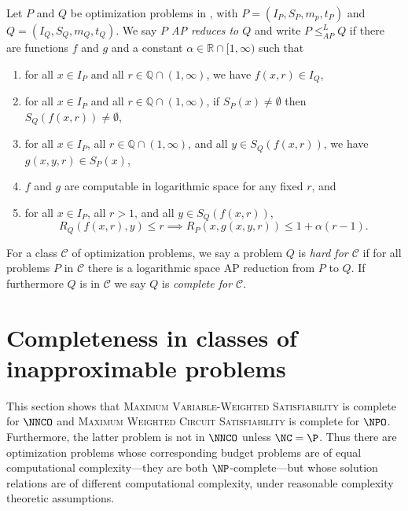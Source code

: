 \begin{definition}{{\cite[Definition~8.3]{acgkmp99}}}
  Let $P$ and $Q$ be optimization problems in \NNCO, with $P = (I_P, S_P, m_p, t_P)$ and $Q = (I_Q, S_Q, m_Q, t_Q)$.
  We say \emph{$P$ AP reduces to $Q$} and write $P \leq_{AP}^{L} Q$ if there are functions $f$ and $g$ and a constant $\alpha \in \mathbb{R} \cap [1, \infty)$ such that
  \begin{enumerate}
  \item for all $x \in I_P$ and all $r \in \mathbb{Q} \cap (1, \infty)$, we have $f(x, r) \in I_Q$,
  \item for all $x \in I_P$ and all $r \in \mathbb{Q} \cap (1, \infty)$, if $S_P(x) \neq \emptyset$ then $S_Q(f(x, r)) \neq \emptyset$,
  \item for all $x \in I_P$, all $r \in \mathbb{Q} \cap (1, \infty)$, and all $y \in S_Q(f(x, r))$, we have $g(x, y, r) \in S_P(x)$,
  \item $f$ and $g$ are computable in logarithmic space for any fixed $r$, and
  \item for all $x \in I_P$, all $r > 1$, and all $y\in S_Q(f(x, r))$,
    \begin{equation*}
      R_Q(f(x, r), y) \leq r \implies R_P(x, g(x, y, r)) \leq 1 + \alpha(r - 1).
    \end{equation*}
  \end{enumerate}
\end{definition}


For a class $\mathcal{C}$ of optimization problems, we say a problem $Q$ is \emph{hard for $\mathcal{C}$} if for all problems $P$ in $\mathcal{C}$ there is a logarithmic space AP reduction from $P$ to $Q$.
If furthermore $Q$ is in $\mathcal{C}$ we say $Q$ is \emph{complete for $\mathcal{C}$}.

\section{Completeness in classes of inapproximable problems}
\label{sec:nncocomplete}

This section shows that \textsc{Maximum Variable-Weighted Satisfiability} is complete for $\NNCO$ and \textsc{Maximum Weighted Circuit Satisfiability} is complete for $\NPO$.
Furthermore, the latter problem is not in $\NNCO$ unless $\NC = \P$.
Thus there are optimization problems whose corresponding budget problems are of equal computational complexity---they are both $\NP$-complete---but whose solution relations are of different computational complexity, under reasonable complexity theoretic assumptions.

